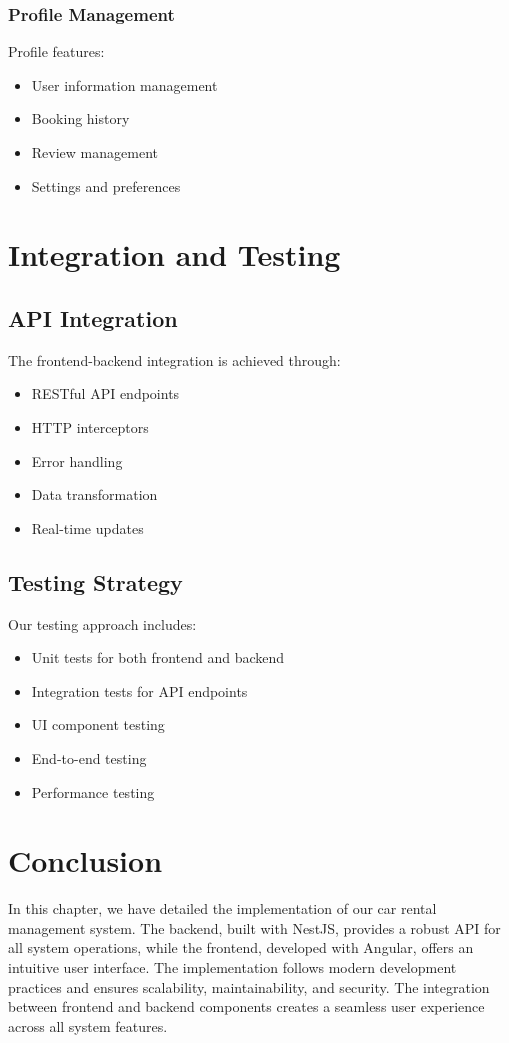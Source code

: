 \subsubsection{Profile Management}
Profile features:

\begin{itemize}
    \item User information management
    \item Booking history
    \item Review management
    \item Settings and preferences
\end{itemize}

\section{Integration and Testing}
\subsection{API Integration}
The frontend-backend integration is achieved through:

\begin{itemize}
    \item RESTful API endpoints
    \item HTTP interceptors
    \item Error handling
    \item Data transformation
    \item Real-time updates
\end{itemize}

\subsection{Testing Strategy}
Our testing approach includes:

\begin{itemize}
    \item Unit tests for both frontend and backend
    \item Integration tests for API endpoints
    \item UI component testing
    \item End-to-end testing
    \item Performance testing
\end{itemize}

\section{Conclusion}
In this chapter, we have detailed the implementation of our car rental management system. The backend, built with NestJS, provides a robust API for all system operations, while the frontend, developed with Angular, offers an intuitive user interface. The implementation follows modern development practices and ensures scalability, maintainability, and security. The integration between frontend and backend components creates a seamless user experience across all system features. 